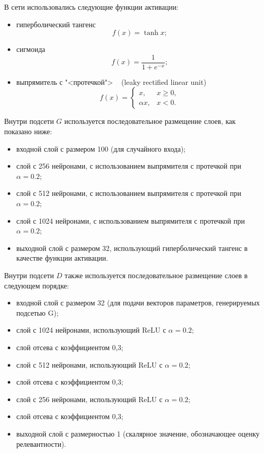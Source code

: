 В сети использовались следующие функции активации:
\begin{itemize}
    \item гиперболический тангенс
    \begin{equation}
        f(x) = \tanh x;
    \end{equation}
    \item сигмоида
    \begin{equation}
        f(x) = \frac{1}{1+e^{-x}};
    \end{equation}
    \item выпрямитель с "<протечкой"> ~\cite{DBLP:journals/corr/XuWCL15} (leaky rectified linear unit)
    \begin{equation}
        f(x) = \begin{cases}
            x, & x \geqslant 0, \\
            \alpha x, & x < 0.
        \end{cases}
    \end{equation}
\end{itemize}

Внутри подсети $G$ используется последовательное размещение слоев, как показано ниже:
\begin{itemize}
    \item входной слой с размером 100 (для случайного
    входа);
    \item слой с 256 нейронами, с использованием выпрямителя с протечкой при $\alpha = 0.2$;
    \item слой с 512 нейронами, с использованием выпрямителя с протечкой при $\alpha = 0.2$;
    \item слой с 1024 нейронами, с использованием выпрямителя с протечкой при $\alpha = 0.2$;
    \item выходной слой с размером 32, использующий гиперболический тангенс в качестве функции активации.
\end{itemize}
Внутри подсети $D$ также используется последовательное размещение слоев в следующем порядке:
\begin{itemize}
    \item входной слой с размером 32 (для подачи векторов параметров, генерируемых подсетью G);
    \item слой с 1024 нейронами, использующий ReLU с $\alpha = 0.2$;
    \item слой отсева с коэффициентом 0,3;
    \item слой с 512 нейронами, использующий ReLU с $\alpha = 0.2$;
    \item слой отсева с коэффициентом 0,3;
    \item слой с 256 нейронами, использующий ReLU с $\alpha = 0.2$;
    \item слой отсева с коэффициентом 0,3;
    \item выходной слой с размерностью 1 (скалярное значение, обозначающее оценку релевантности).
\end{itemize}

